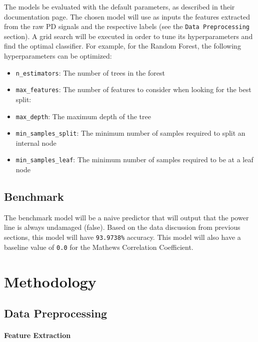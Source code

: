\documentclass[11pt]{article}
\providecommand{\tightlist}{%
      \setlength{\itemsep}{0pt}\setlength{\parskip}{0pt}}
\begin{document}
The models be evaluated with the
default parameters, as described in their documentation page. The chosen model will use as inputs the features extracted from the raw
PD signals and the respective labels (see the
\texttt{Data\ Preprocessing} section). A grid search will be executed in
order to tune its hyperparameters and find the optimal classifier. For
example, for the Random Forest, the following hyperparameters can be
optimized:

\begin{itemize}
\tightlist
\item
  \texttt{n\_estimators}: The number of trees in the forest
\item
  \texttt{max\_features}: The number of features to consider when
  looking for the best split:
\item
  \texttt{max\_depth}: The maximum depth of the tree
\item
  \texttt{min\_samples\_split}: The minimum number of samples required
  to split an internal node
\item
  \texttt{min\_samples\_leaf}: The minimum number of samples required to
  be at a leaf node
\end{itemize}

\hypertarget{benchmark}{%
\subsection{Benchmark}\label{benchmark}}

The benchmark model will be a naive predictor that will output that the
power line is always undamaged (false). Based on the data discussion
from previous sections, this model will have \texttt{93.9738\%}
accuracy. This model will also have a baseline value of \texttt{0.0} for
the Mathews Correlation Coefficient.

    \hypertarget{iii.-methodology}{%
\section{Methodology}\label{iii.-methodology}}

\hypertarget{data-preprocessing}{%
\subsection{Data Preprocessing}\label{data-preprocessing}}

\hypertarget{feature-extraction}{%
\paragraph{Feature Extraction}\label{feature-extraction}}
\end{document}
